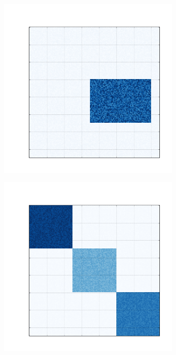 \documentclass[
    12pt,                %
    oneside,            %
    a4paper,            %
    english,            %
    brazil                %
    ]{abntex2ppgsi}
\begin{document}

\begin{figure}[H]
\centering
    \caption{
        As primeiras cinco matrizes são as matrizes originais, as demais são suas respectivas reconstruções, realizadas a partir dos resultados obtidos com o algoritmo \textit{BinOvNMTF}.
    }
    \begin{subfigure}[b]{0.18\textwidth}
        \includegraphics[width=\textwidth]{img/a-bic-structure.png}
    \end{subfigure}
    \begin{subfigure}[b]{0.18\textwidth}
        \includegraphics[width=\textwidth]{img/b-bic-structure.png}

\end{subfigure}
\end{figure}
\end{document}
